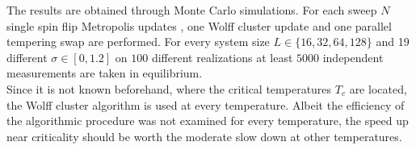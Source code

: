 \label{sec:results}
The results are obtained through Monte Carlo simulations. For each
sweep \(N\) single spin flip Metropolis updates \cite{Metropolis1953},
one Wolff cluster update \cite{Wolff1989} and one
parallel tempering swap \cite{ParallelTempering1986} are performed.
For every system size $L \in \{16,32,64,128\}$ and 19 different
$\sigma \in [0,1.2]$ on $100$ different realizations at least $5000$
independent measurements are taken in equilibrium.\\
Since it is not known beforehand, where the critical temperatures \(T_c\)
are located, the Wolff cluster algorithm is used at every
temperature. Albeit the efficiency of the algorithmic procedure was
not examined for every temperature, the speed up near criticality
should be worth the moderate slow down at other temperatures.\\

